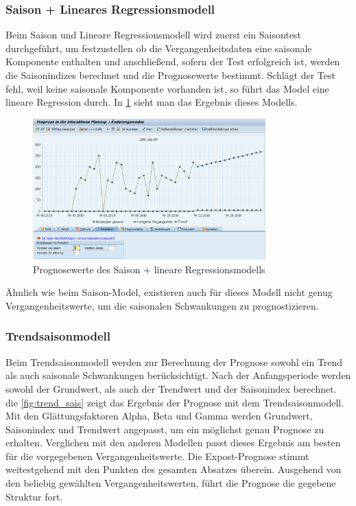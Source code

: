 \subsubsection{Saison + Lineares Regressionsmodell}
Beim Saison und Lineare Regressionsmodell wird zuerst ein Saisontest durchgeführt, um festzustellen ob die Vergangenheitsdaten eine saisonale Komponente enthalten und anschließend, sofern der Test erfolgreich ist, werden die Saisonindizes berechnet und die Prognosewerte bestimmt. Schlägt der Test fehl, weil keine saisonale Komponente vorhanden ist, so führt das Model eine lineare Regression durch. \cite{scm:season_lin_reg_6}
In \ref{fig:sais_lin_reg} sieht man das Ergebnis dieses Modells.

\begin{figure}[h]
	\centering
	\includegraphics[width=0.8\textwidth]{../pics/lineare_sainsonal_regressionamodell_nko}
	\caption{Prognosewerte des Saison + lineare Regressionsmodells}
	\label{fig:sais_lin_reg}
\end{figure}
Ähnlich wie beim Saison-Model, existieren auch für dieses Modell nicht genug Vergangenheitswerte, um die saisonalen Schwankungen zu prognostizieren. 

\subsubsection{Trendsaisonmodell}
Beim Trendsaisonmodell werden zur Berechnung der Prognose sowohl ein Trend als auch saisonale Schwankungen berücksichtigt. Nach der Anfangsperiode werden sowohl der Grundwert, als auch der Trendwert und der Saisonindex berechnet. \cite{scm:trends_season_lin_reg_7}
die \ref{fig:trend_sais} zeigt das Ergebnis der Prognose mit dem Trendsaisonmodell. Mit den Glättungsfaktoren Alpha, Beta und Gamma werden Grundwert, Saisonindex  und Trendwert angepasst, um ein möglichst genau Prognose zu erhalten. 
Verglichen mit den anderen Modellen passt dieses Ergebnis am besten für die vorgegebenen Vergangenheitswerte. Die Expost-Prognose stimmt weitestgehend mit den Punkten des gesamten Absatzes überein. Ausgehend von den beliebig gewählten Vergangenheitswerten, führt die Prognose die gegebene Struktur fort.


